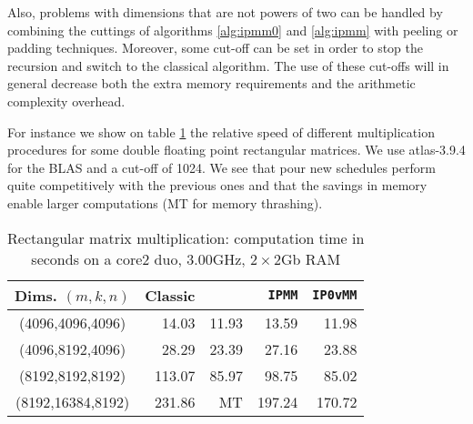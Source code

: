 \documentclass{article}
\newcommand{\dhss}{\cite{Douglas:1994:gemmw}\xspace}
\begin{document}
Also, problems with dimensions that are not powers of two can be handled 
by combining the cuttings of algorithms \ref{alg:ipmm0} and
\ref{alg:ipmm} with peeling or padding techniques. Moreover,
some cut-off can be set in order to stop the recursion and switch
to the classical algorithm. The use of these cut-offs
will in general decrease both the extra memory requirements and the arithmetic
complexity overhead.

For instance we show on table \ref{tab:ipmmperf} the relative speed of
different multiplication procedures for some double floating point 
rectangular matrices. We use atlas-3.9.4 for the BLAS and a cut-off
of 1024.
We see that pour new schedules perform quite competitively with the
previous ones and that the savings in memory enable larger
computations (MT for memory thrashing).
\begin{table}[htbp]\center
\begin{tabular}{|c||r|r|r|r|}
\hline
Dims. $(m,k,n)$ & Classic & \dhss{} & \texttt{IPMM} & \texttt{IP0vMM} \\
\hline
(4096,4096,4096)  & 14.03  & 11.93   & 13.59  & 11.98\\
(4096,8192,4096)  & 28.29  & 23.39   & 27.16  & 23.88  \\
(8192,8192,8192)  & 113.07 & 85.97   & 98.75  & 85.02\\
(8192,16384,8192) & 231.86 & MT      & 197.24 & 170.72\\
\hline
\end{tabular}
\caption{Rectangular matrix multiplication: computation time in seconds  on a core2 duo,
  3.00GHz, $2\times$2Gb RAM}\label{tab:ipmmperf}
\end{table}



\newcommand{\SortNoop}[1]{}
\end{document}

